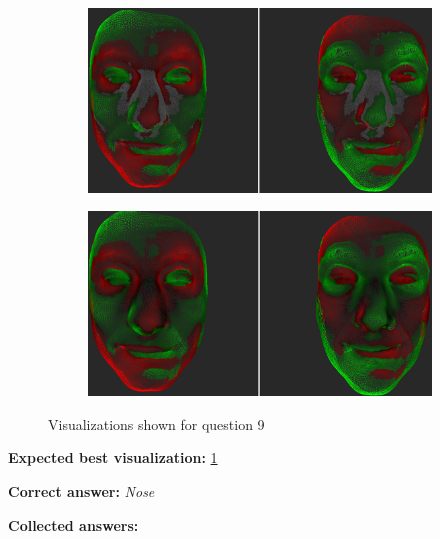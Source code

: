 \begin{figure}[h]
\begin{subfigure}{0.49\textwidth}
\includegraphics[width=\textwidth]{./img-study/pair23.PNG}
\caption{}
\label{fig:study-8-23}
\end{subfigure}
\begin{subfigure}{0.49\textwidth}
\includegraphics[width=\textwidth]{./img-study/pair20.PNG}
\caption{}
\label{fig:study-8-20}
\end{subfigure}
\caption{Visualizations shown for question 9}
\end{figure}
\medskip

{\bf Expected best visualization:} \ref{fig:study-8-23}
\medskip

{\bf Correct answer:} {\it Nose}
\medskip

{\bf Collected answers:}


